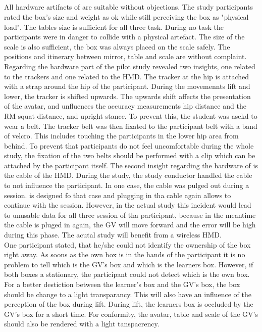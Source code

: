 \subsection{\exgo}
All hardware artifacts of \exgo are suitable without objections. The study participants rated the box's size and weight as ok while still perceiving the box as "physical load". The tables size is sufficient for all three task. During no task the participants were in danger to collide with a physical artefact. The size of the scale is also sufficient, the box was always placed on the scale safely. The positions and itinerary between mirror, table and scale are without complaint. Regarding the hardware part of \exgo the pilot study revealed two insights, one related to the trackers and one related to the HMD. The tracker at the hip is attached with a strap around the hip of the participant. During the movemennts lift and lower, the tracker is shifted upwards. The upwards shift affects the presentation of the avatar, and unfluences the accuracy measurements hip distance and the RM squat distance, and upright stance. To prevent this, the student was asekd to wear a belt. The tracker belt was then fixated to the participant belt with a band of velcro. This includes touching the participants in the lower hip area from behind. To prevent that participants do not feel uncomfortable during the whole study, the fixation of the two belts should be performed with a clip which can be attached by the participant itself. The second insight regarding the hardware of \exgo is the cable of the HMD. During the study, the study conductor handled the cable to not influence the participant. In one case, the cable was pulged out during a session. \exgo is designed fo that case and plugging in tha cable again allows to continue with the session. However, in the actual study this incident would lead to unusable data for all three session of tha participant, because in the meantime the cable is pluged in again, the GV will move forward and the error will be high during this phase. The acutal study will benefit from a wireless HMD.\\
One participant stated, that he/she could not identify the ownership of the box right away. As soons as the own box is in the hands of the participant it is no problem to tell which is the GV's box and which is the learners box. However, if both boxes a stationary, the participant could not detect which is the own box. For a better destiction between the learner's box and the GV's box, the box should be change to a light transparancy. This will also have an influence of the perception of the box during lift. During lift, the learners box is occluded by the GV's box for a short time. For conformity, the avatar, table and scale of the GV's should also be rendered with a light tanspacrency.\\
